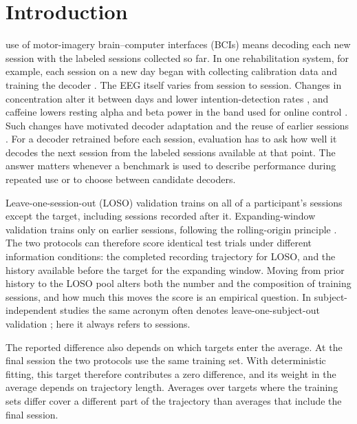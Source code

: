 \documentclass{ieeeaccess}
\begin{document}
\section{Introduction}
\label{sec:introduction}
 use of motor-imagery brain--computer interfaces (BCIs)
means decoding each new session with the labeled sessions collected so far.
In one rehabilitation system, for example, each session on a new day began
with collecting calibration data and training the decoder
\cite{hernandezrojas2022fes}. The EEG itself varies from session to session.
Changes in concentration alter it between days and lower intention-detection
rates \cite{maswanganyi2022intersession}, and caffeine lowers resting alpha and
beta power in the band used for online control \cite{meng2017softdrinks}. Such
changes have motivated decoder adaptation and the reuse of earlier sessions
\cite{krauledat2008zero,wimpff2025continual}. For a decoder retrained before
each session, evaluation has to ask how well it decodes the next session from
the labeled sessions available at that point. The answer matters whenever a
benchmark is used to describe performance during repeated use or to choose
between candidate decoders.

Leave-one-session-out (LOSO) validation trains on all of a participant's
sessions except the target, including sessions recorded after it.
Expanding-window validation trains only on earlier sessions, following the
rolling-origin principle \cite{tashman2000outofsample}. The two protocols can
therefore score identical test trials under different information conditions:
the completed recording trajectory for LOSO, and the history available before
the target for the expanding window. Moving from prior history to the LOSO pool
alters both the number and the composition of training sessions, and how much
this moves the score is an empirical question. In subject-independent studies
the same acronym often denotes leave-one-subject-out validation
\cite{keutayeva2023attention,sugata2026fear}; here it always refers to sessions.

The reported difference also depends on which targets enter the average. At the
final session the two protocols use the same training set. With deterministic
fitting, this target therefore contributes a zero difference, and its weight in
the average depends on trajectory length. Averages over targets where the
training sets differ cover a different part of the trajectory than averages
that include the final session.
\end{document}
